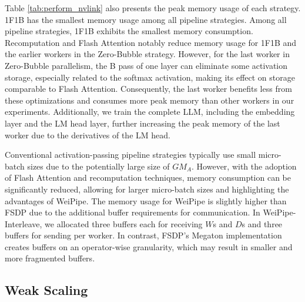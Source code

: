 \documentclass[sigplan,review,anonymous]{acmart}
\begin{document}
Table \ref{tab:perform_nvlink} also presents the peak memory usage of each strategy. 1F1B has the smallest memory usage among all pipeline strategies.  Among all pipeline strategies, 1F1B exhibits the smallest memory consumption. Recomputation and Flash Attention notably reduce memory usage for 1F1B and the earlier workers in the Zero-Bubble strategy. However, for the last worker in Zero-Bubble parallelism, the B pass of one layer can eliminate some activation storage, especially related to the softmax activation, making its effect on storage comparable to Flash Attention. Consequently, the last worker benefits less from these optimizations and consumes more peak memory than other workers in our experiments. Additionally, we train the complete LLM, including the embedding layer and the LM head layer, further increasing the peak memory of the last worker due to the derivatives of the LM head.

Conventional activation-passing pipeline strategies typically use small micro-batch sizes due to the potentially large size of $GM_A$. However, with the adoption of Flash Attention and recomputation techniques, memory consumption can be significantly reduced, allowing for larger micro-batch sizes and highlighting the advantages of WeiPipe.  The memory usage for WeiPipe is slightly higher than FSDP due to the additional buffer requirements for communication. In WeiPipe-Interleave, we allocated three buffers each for receiving $W$s and $D$s and three buffers for sending per worker. In contrast, FSDP's Megaton implementation creates buffers on an operator-wise granularity, which may result in smaller and more fragmented buffers.



\subsection{Weak Scaling}
\end{document}
